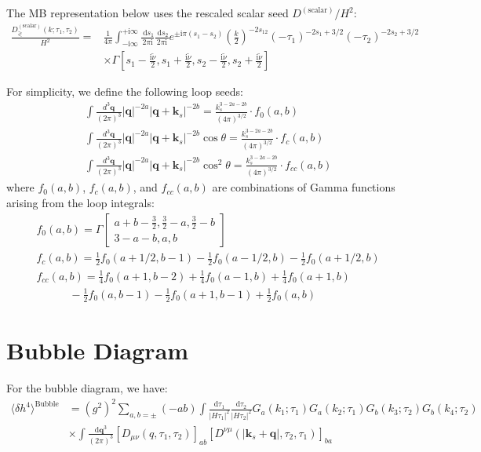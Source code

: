 \documentclass[a4paper,12pt]{article}
\def\di{{\mathrm{d}}}
\def\mb{\mathbf}
\def\la{\langle}\def\ra{\rangle}
\begin{document}
The MB representation below uses the rescaled scalar seed $D^{(\text{scalar})}/H^2$:
\begin{align}
    \frac{D_\gtrless^{(\text{scalar})}\left(k ; \tau_{1}, \tau_{2}\right)}{H^2}= & \frac{1}{4 \pi} \int_{-\mathrm{i} \infty}^{+\mathrm{i} \infty} \frac{\mathrm{~d} s_{1}}{2 \pi \mathrm{i}} \frac{\mathrm{~d} s_{2}}{2 \pi \mathrm{i}} e^{\pm \mathrm{i} \pi\left(s_{1}-s_{2}\right)}\left(\frac{k}{2}\right)^{-2 s_{12}}\left(-\tau_{1}\right)^{-2 s_{1}+3 / 2}\left(-\tau_{2}\right)^{-2 s_{2}+3 / 2} \\
    & \times \Gamma\left[s_{1}-\frac{\mathrm{i} \widetilde{\nu}}{2}, s_{1}+\frac{\mathrm{i} \widetilde{\nu}}{2}, s_{2}-\frac{\mathrm{i} \widetilde{\nu}}{2}, s_{2}+\frac{\mathrm{i} \widetilde{\nu}}{2}\right]
\end{align}

For simplicity, we define the following loop seeds:
\begin{align}
    &\int \frac{d^3\mathbf{q}}{(2\pi)^3} |\mathbf{q}|^{-2a} |\mathbf{q} + \mathbf{k}_s|^{-2b} = \frac{k_s^{3-2a-2b}}{(4\pi)^{3/2}} \cdot f_0(a,b) \\
    &\int \frac{d^3\mathbf{q}}{(2\pi)^3} |\mathbf{q}|^{-2a} |\mathbf{q} + \mathbf{k}_s|^{-2b} \cos\theta = \frac{k_s^{3-2a-2b}}{(4\pi)^{3/2}} \cdot f_c(a,b) \\
    &\int \frac{d^3\mathbf{q}}{(2\pi)^3} |\mathbf{q}|^{-2a} |\mathbf{q} + \mathbf{k}_s|^{-2b} \cos^2\theta = \frac{k_s^{3-2a-2b}}{(4\pi)^{3/2}} \cdot f_{cc}(a,b) 
\end{align}
where $f_0(a,b)$, $f_c(a,b)$, and $f_{cc}(a,b)$ are combinations of Gamma functions arising from the loop integrals:
\begin{align}
    &f_0(a,b) = \Gamma \left[\begin{array}{c}
    a+b-\frac{3}{2}, \frac{3}{2}-a, \frac{3}{2}-b \\
    3-a-b, a,b
    \end{array}\right] \\
    &f_c(a,b) = \frac{1}{2}f_0(a+1/2,b-1) - \frac{1}{2}f_0(a-1/2,b) - \frac{1}{2}f_0(a+1/2,b) \\
    &f_{cc}(a,b) = \frac{1}{4}f_0(a+1,b-2) + \frac{1}{4}f_0(a-1,b) + \frac{1}{4}f_0(a+1,b) \nonumber \\
    &\qquad \quad - \frac{1}{2}f_0(a,b-1) -\frac{1}{2}f_0(a+1,b-1) +\frac{1}{2}f_0(a,b)
\end{align}

\section{Bubble Diagram}
For the bubble diagram, we have:
\begin{align}
    \la \delta h^4 \ra^{\text{Bubble}} &= \left( g^2 \right)^2 \sum_{a,b=\pm} (-ab) \int \frac{\di \tau_1}{|H \tau_1|^2} \frac{\di \tau_2}{|H \tau_2|^2} G_a(k_1;\tau_1) G_a(k_2;\tau_1) G_b(k_3;\tau_2) G_b(k_4;\tau_2) \nonumber \\
    &\times \int \frac{\di \mb{q}^3}{(2\pi)^3} \left[ D_{\mu\nu}(q,\tau_1,\tau_2) \right]_{ab} \left[ D^{\nu\mu}(|\mb{k}_s + \mb{q}|,\tau_2,\tau_1) \right]_{ba}
\end{align}
\end{document}
